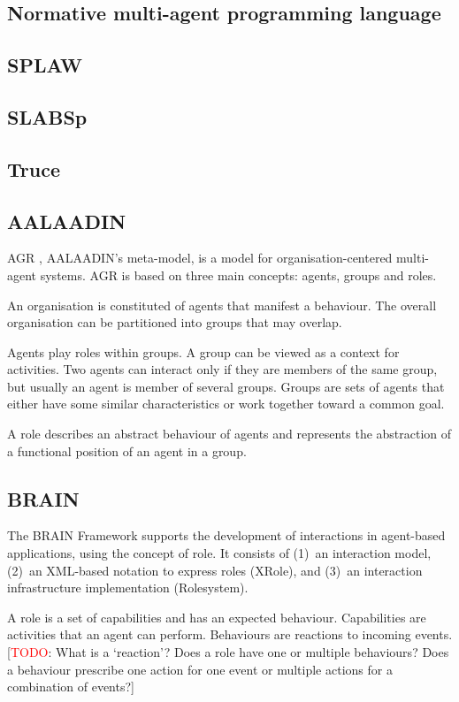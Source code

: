 \documentclass{article}
\newcommand{\todo}[1]{[\textcolor{red}{TODO}: #1]}
\begin{document}
\subsection{Normative multi-agent programming language}
\subsection{SPLAW}
\subsection{SLABSp}
\subsection{Truce}

\subsection{AALAADIN} 
\label{sec:aalaadin}

AGR \cite{conf/aose/FerberGM03}, AALAADIN's meta-model, is a model for organisation-centered
multi-agent systems. AGR is based on three main concepts: agents,
groups and roles.

An organisation is constituted of agents that manifest a behaviour.
The overall organisation can be partitioned into groups that may
overlap. 

Agents play roles within groups. A group can be viewed as a
context for activities. Two agents can interact only if they are
members of the same group, but usually an agent is member of
several groups. Groups are sets of agents that either have some
similar characteristics or work together toward a common goal.

A role describes an abstract behaviour of agents and represents the
abstraction of a functional position of an agent in a group.

\subsection{BRAIN} 

The BRAIN Framework \cite{conf/coopis/CabriLZ03} supports the development of
interactions in agent-based applications, using the concept of role. It
consists of (1)~an interaction model, (2)~an XML-based notation to express
roles (XRole), and (3)~an interaction infrastructure implementation
(Rolesystem).

A role is a set of capabilities and has an expected behaviour.
Capabilities are activities that an agent can perform. Behaviours
are reactions to incoming events. \todo{What is a `reaction'?
Does a role have one or multiple behaviours? Does a behaviour
prescribe one action for one event or multiple actions for a
combination of events?}
\end{document}
